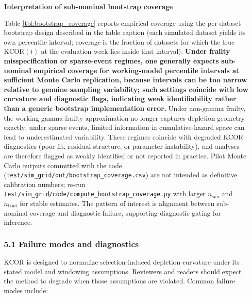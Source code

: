 \documentclass[
]{article}
\begin{document}
\textbf{Interpretation of sub-nominal bootstrap coverage}

Table \ref{tbl:bootstrap_coverage} reports empirical coverage using the
per-dataset bootstrap design described in the table caption (each
simulated dataset yields its own percentile interval; coverage is the
fraction of datasets for which the true \(\mathrm{KCOR}(t)\) at the
evaluation week lies inside that interval). \textbf{Under frailty
misspecification or sparse-event regimes, one generally expects
sub-nominal empirical coverage for working-model percentile intervals at
sufficient Monte Carlo replication, because intervals can be too narrow
relative to genuine sampling variability; such settings coincide with
low curvature and diagnostic flags, indicating weak identifiability
rather than a generic bootstrap implementation error.} Under non-gamma
frailty, the working gamma-frailty approximation no longer captures
depletion geometry exactly; under sparse events, limited information in
cumulative-hazard space can lead to underestimated variability. These
regimes coincide with degraded KCOR diagnostics (poor fit, residual
structure, or parameter instability), and analyses are therefore flagged
as weakly identified or not reported in practice. Pilot Monte Carlo
outputs committed with the code
(\texttt{test/sim\_grid/out/bootstrap\_coverage.csv}) are not intended
as definitive calibration numbers; re-run
\texttt{test/sim\_grid/code/compute\_bootstrap\_coverage.py} with larger
\(n_{\mathrm{sim}}\) and \(n_{\mathrm{boot}}\) for stable estimates. The
pattern of interest is alignment between sub-nominal coverage and
diagnostic failure, supporting diagnostic gating for inference.

\subsubsection{5.1 Failure modes and
diagnostics}\label{failure-modes-and-diagnostics}

KCOR is designed to normalize selection-induced depletion curvature
under its stated model and windowing assumptions. Reviewers and readers
should expect the method to degrade when those assumptions are violated.
Common failure modes include:
\end{document}

